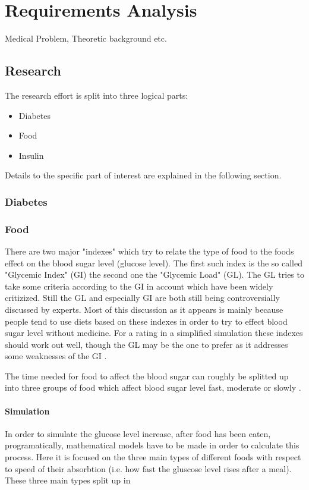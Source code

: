 \section{Requirements Analysis}
Medical Problem, Theoretic background etc.

\subsection{Research}
The research effort is split into three logical parts:
\begin{itemize}
  \item Diabetes
  \item Food
  \item Insulin
\end{itemize}
Details to the specific part of interest are explained in the following section.

\subsubsection{Diabetes}

\subsubsection{Food}
There are two major "indexes" which try to relate the type of food to the foods effect on the blood sugar level (glucose level).
The first such index is the so called "Glycemic Index" (GI) the second one the "Glycemic Load" (GL).
The GL tries to take some criteria according to the GI in account which have been widely critizized.
Still the GL and especially GI are both still being controversially discussed by experts.
Most of this discussion as it appears is mainly because people tend to use
diets based on these indexes in order to try to effect blood sugar level
without medicine. For a rating in a simplified simulation these indexes should
work out well, though the GL may be the one to prefer as it addresses some
weaknesses of the GI \cite{norden:glycemicindex}.

The time needed for food to affect the blood sugar can roughly be splitted up
into three groups of food which affect blood sugar level fast, moderate or
slowly \cite{mit:glycemicindex}.

\paragraph{Simulation}
In order to simulate the glucose level increase, after food has been eaten, programatically, mathematical models have to be made in order to calculate this process.
Here it is focused on the three main types of different foods with respect to speed of their absorbtion (i.e. how fast the gluscose level rises after a meal).
These three main types split up in


